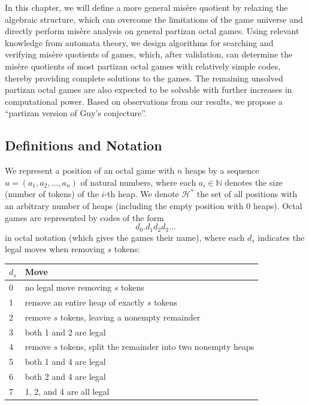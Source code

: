 \documentclass[11pt]{article}
\theoremstyle{definition}
\theoremstyle{plain}
\newcommand{\varH}{\mathcal{H}}
\begin{document}
In this chapter, we will define a more general misère quotient by relaxing the algebraic structure, which can overcome the limitations of the game universe and directly perform misère analysis on general partizan octal games.
Using relevant knowledge from automata theory, we design algorithms for searching and verifying misère quotients of games,
which, after validation, can determine the misère quotients of most partizan octal games with relatively simple codes, thereby providing complete solutions to the games.
The remaining unsolved partizan octal games are also expected to be solvable with further increases in computational power.
Based on observations from our results, we propose a ``partizan version of Guy's conjecture''.

\subsection{Definitions and Notation}

We represent a position of an octal game with $n$ heaps by a sequence $u = (a_1, a_2, \ldots, a_n)$ of natural numbers,
where each $a_i \in\mathbb{N}$ denotes the size (number of tokens) of the $i$-th heap.
We denote $\varH^*$ the set of all positions with an arbitrary number of heaps (including the empty position with $0$ heaps).
Octal games are represented by codes of the form
\[
    d_0.d_1 d_2 d_3 \ldots
\]
in octal notation (which gives the games their name), where each $d_s$ indicates the legal moves when removing $s$ tokens:

\begin{center}
    \small
    \begin{tabular}{ll}
        \hline
        $d_s$ & Move \\
        \hline
        0 & no legal move removing $s$ tokens \\
        1 & remove an entire heap of exactly $s$ tokens \\
        2 & remove $s$ tokens, leaving a nonempty remainder \\
        3 & both 1 and 2 are legal \\
        4 & remove $s$ tokens, split the remainder into two nonempty heaps \\
        5 & both 1 and 4 are legal \\
        6 & both 2 and 4 are legal \\
        7 & 1, 2, and 4 are all legal \\
        \hline
    \end{tabular}
    \normalsize
\end{center}
\end{document}
